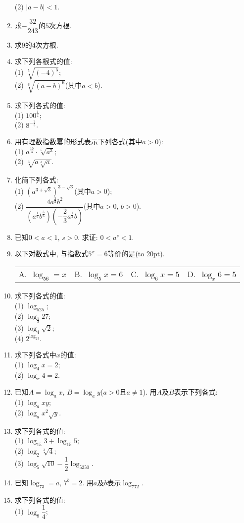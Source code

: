 \documentclass[10pt,a4paper]{article}
\newcommand{\bracket}[1]{(\hbox to #1pt{})}
\newcommand{\fourch}[4]{\par\begin{tabular}{p{.23\textwidth}p{.23\textwidth}p{.23\textwidth}p{.23\textwidth}}
A.~#1 &B.~#2& C.~#3& D.~#4
\end{tabular}}
\begin{document}
\begin{enumerate}[1.]
(2) $|a-b| <1$. 
\item 求$-\dfrac{32}{243}$的$5$次方根.
\item 求$9$的$4$次方根.
\item 求下列各根式的值:\\
(1) $\sqrt[5]{(-4)^5}$;\\
(2) $\sqrt[6]{(a-b)^6}$(其中$a<b$).
\item 求下列各式的值:\\
(1) $100^\frac 12$;\\
(2) $8^{-\frac23}$.
\item 用有理数指数幂的形式表示下列各式(其中$a>0$):\\
(1) $a^{\frac{10}3}\cdot \sqrt[5]{a^3}$;\\
(2) $\sqrt[3]{a\sqrt[3]{a}}$.
\item 化简下列各式:\\
(1) $(a^{3+\sqrt 3})^{3-\sqrt 3}$(其中$a>0$);\\
(2) $\dfrac{4a^{\frac 23}b^2}{(a^{\frac 16}b^{\frac 56})(-\dfrac 23 a^{\frac 12}b)}$(其中$a>0$, $b>0$).
\item 已知$0<a<1$, $s>0$. 求证: $0<a^s<1$.
\item 以下对数式中, 与指数式$5^x=6$等价的是\bracket{20}.
\fourch{$\log_56=x$}{$\log_5x=6$}{$\log_6x=5$}{$\log_x6=5$}
\item 求下列各式的值:\\
(1) $\log_525$;\\
(2) $\log_{\frac 13}27$;\\
(3) $\log_4\sqrt 2$;\\
(4) $2^{\log_23}$.
\item 求下列各式中$x$的值:\\
(1) $\log_4x=2$;\\
(2) $\log_x4=2$. 
\item 已知$A=\log_ax$, $B=\log_ay$($a>0$且$a\ne 1$). 用$A$及$B$表示下列各式:\\
(1) $\log_axy$;\\
(2) $\log_ax^2\sqrt y$.
\item 求下列各式的值:\\
(1) $\log_{15}3+\log_{15}5$;\\
(2) $\log_2\sqrt[3]{4}$;\\
(3) $\log_5\sqrt{10}-\dfrac 12\log_5250$.
\item 已知$\log_73=a$, $7^b=2$. 用$a$及$b$表示$\log_772$. 
\item 求下列各式的值:\\
(1) $\log_8\dfrac 14$;\\

\end{enumerate}
\end{document}
